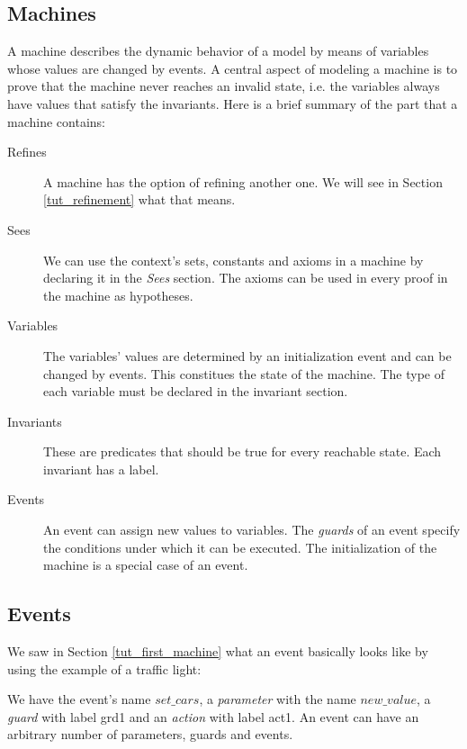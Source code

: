 \subsection{Machines}
\label{tut_machines}

A machine describes the dynamic behavior of a model by means of
variables whose values are changed by events.
A central aspect of modeling a machine is to prove that the machine
never reaches an invalid state, i.e. the variables always have values
that satisfy the invariants.
Here is a brief summary of the part that a machine contains:

\begin{description}
\item[Refines]  A machine has the option of refining another one.
  We will see in Section \ref{tut_refinement} what that means.
\item[Sees]  We can use the context's sets, constants and axioms  in
  a machine by declaring it in the \textsl{Sees} section.
  The axioms can be used in every proof in the machine as hypotheses.
\item[Variables] 
  The variables' values are determined by an initialization event and
  can be changed by events. This constitues the state of the machine. The type of each variable must be declared in the invariant section.
\item[Invariants] 
  These are predicates that should be true for every reachable state.
  Each invariant has a label.
\item[Events] 
  An event can assign new values to variables.
  The \emph{guards} of an event specify the conditions under which it can be executed.
  The initialization of the machine is a special case of an event.
\end{description}

\subsection{Events}
\label{tut_events}

We saw in Section \ref{tut_first_machine} what an event basically looks like by using the example of a traffic light:
\begin{description}
		\begin{description}
		\AnyPrm
			\begin{description}
			\end{description}
		\WhereGrd
			\begin{description}
			\nItemX{ grd1 }{ new\_value \in  BOOL }
			\end{description}
		\ThenAct
			\begin{description}
			\nItemX{ act1 }{ cars\_go :=  new\_value }
			\end{description}
		\EndAct
		\end{description}
\end{description}
We have the event's name $set\_cars$, a \emph{parameter} with the name $new\_value$,
a \emph{guard} with label grd1 and an \emph{action} with label act1.
An event can have an arbitrary number of parameters, guards and events.

